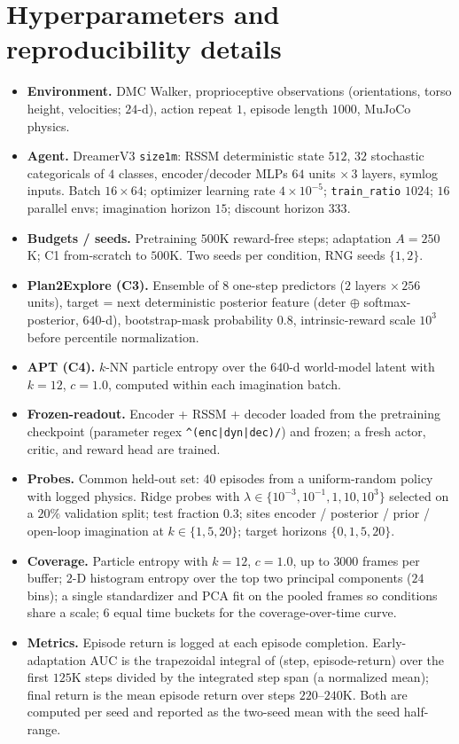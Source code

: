 \documentclass{article}
\begin{document}
\section{Hyperparameters and reproducibility details}
\begin{itemize}
\item \textbf{Environment.} DMC Walker, proprioceptive observations
(orientations, torso height, velocities; $24$-d), action repeat $1$, episode
length $1000$, MuJoCo physics.
\item \textbf{Agent.} DreamerV3 \texttt{size1m}: RSSM deterministic state $512$,
$32$ stochastic categoricals of $4$ classes, encoder/decoder MLPs $64$ units
$\times\,3$ layers, symlog inputs. Batch $16 \times 64$; optimizer learning rate
$4\times10^{-5}$; \texttt{train\_ratio} $1024$; $16$ parallel envs; imagination
horizon $15$; discount horizon $333$.
\item \textbf{Budgets / seeds.} Pretraining $500$K reward-free steps; adaptation
$A=250$K; C1 from-scratch to $500$K. Two seeds per condition, RNG seeds
$\{1,2\}$.
\item \textbf{Plan2Explore (C3).} Ensemble of $8$ one-step predictors ($2$
layers $\times\,256$ units), target = next deterministic posterior feature
(deter $\oplus$ softmax-posterior, $640$-d), bootstrap-mask probability $0.8$,
intrinsic-reward scale $10^3$ before percentile normalization.
\item \textbf{APT (C4).} $k$-NN particle entropy over the $640$-d world-model
latent with $k=12$, $c=1.0$, computed within each imagination batch.
\item \textbf{Frozen-readout.} Encoder + RSSM + decoder loaded from the
pretraining checkpoint (parameter regex \texttt{\^{}(enc|dyn|dec)/}) and frozen;
a fresh actor, critic, and reward head are trained.
\item \textbf{Probes.} Common held-out set: $40$ episodes from a uniform-random
policy with logged physics. Ridge probes with $\lambda \in \{10^{-3},10^{-1},
1,10,10^{3}\}$ selected on a $20\%$ validation split; test fraction $0.3$; sites
encoder / posterior / prior / open-loop imagination at $k\in\{1,5,20\}$; target
horizons $\{0,1,5,20\}$.
\item \textbf{Coverage.} Particle entropy with $k=12$, $c=1.0$, up to $3000$
frames per buffer; $2$-D histogram entropy over the top two principal components
($24$ bins); a single standardizer and PCA fit on the pooled frames so
conditions share a scale; $6$ equal time buckets for the coverage-over-time
curve.
\item \textbf{Metrics.} Episode return is logged at each episode completion.
Early-adaptation AUC is the trapezoidal integral of (step, episode-return) over
the first $125$K steps divided by the integrated step span (a normalized mean);
final return is the mean episode return over steps $220$--$240$K. Both are
computed per seed and reported as the two-seed mean with the seed half-range.
\end{itemize}
\end{document}
